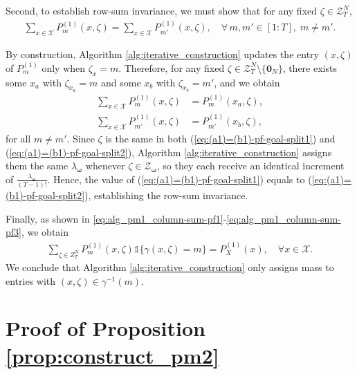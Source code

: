 \documentclass[11pt,letterpaper]{article}
\newcommand{\cX}{\mathcal{X}}
\newcommand{\cZ}{\mathcal{Z}}
\begin{document}
Second, to establish row-sum invariance, we must show that for any fixed $\zeta \in \cZ^N_T$,
\begin{align}
    \sum_{x \in \cX}P_m^{(1)}(x,\zeta) = \sum_{x \in \cX}P_{m'}^{(1)}(x,\zeta), \quad \forall\, m, m' \in [1:T],\; m\neq m'.
\end{align}

By construction, Algorithm \ref{alg:iterative_construction} updates the entry $(x,\zeta)$ of $P_m^{(1)}$ only when $\zeta_x = m$. Therefore, for any fixed $\zeta \in \cZ^N_T \setminus \{ \mathbf{0}_N\}$, there exists some $x_a$ with $\zeta_{x_a} = m$ and some $x_b$ with $\zeta_{x_b} = m'$, and we obtain
\begin{align}
    \sum_{x \in \cX} P^{(1)}_m(x, \zeta) & = P^{(1)}_m(x_a, \zeta), \label{eq:(a1)=(b1)-pf-goal-split1}\\
    \sum_{x \in \cX} P^{(1)}_{m'}(x, \zeta) & = P^{(1)}_{m'}(x_b, \zeta), \label{eq:(a1)=(b1)-pf-goal-split2}
\end{align}
for all $m \neq m'$. Since $\zeta$ is the same in both (\ref{eq:(a1)=(b1)-pf-goal-split1}) and (\ref{eq:(a1)=(b1)-pf-goal-split2}), Algorithm \ref{alg:iterative_construction} assigns them the same $\lambda_{\boldsymbol{\omega}}$ whenever $\zeta \in \cZ_{\boldsymbol{\omega}}$, so they each receive an identical increment of $\frac{\lambda_{\boldsymbol{\omega}}}{(T-1)!}$. Hence, the value of (\ref{eq:(a1)=(b1)-pf-goal-split1}) equals to (\ref{eq:(a1)=(b1)-pf-goal-split2}), establishing the row-sum invariance.

Finally, as shown in \eqref{eq:alg_pm1_column-sum-pf1}-\eqref{eq:alg_pm1_column-sum-pf3}, we obtain
\begin{align}
    \sum_{\zeta \in Z^N_T}P_m^{(1)}(x, \zeta) \mathds{1} \{ \gamma(x,\zeta) = m\} = P_X^{(1)}(x), \quad \forall x \in \cX. \label{eq:show_pm1_alpha/T}
\end{align}
We conclude that Algorithm \ref{alg:iterative_construction} only assigns mass to entries with $(x,\zeta) \in \gamma^{-1}(m)$. 

\section{Proof of Proposition \ref{prop:construct_pm2}} \label{sec:proof_pm2_prop}
\end{document}
